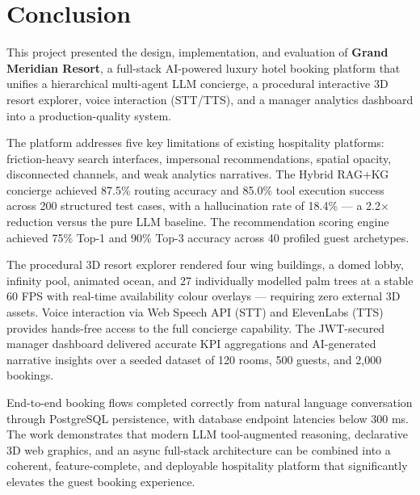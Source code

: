 \documentclass[11pt,a4paper]{report}
\begin{document}
\chapter{Conclusion}

This project presented the design, implementation, and evaluation of \textbf{Grand Meridian Resort}, a full-stack AI-powered luxury hotel booking platform that unifies a hierarchical multi-agent LLM concierge, a procedural interactive 3D resort explorer, voice interaction (STT/TTS), and a manager analytics dashboard into a production-quality system.

The platform addresses five key limitations of existing hospitality platforms: friction-heavy search interfaces, impersonal recommendations, spatial opacity, disconnected channels, and weak analytics narratives. The Hybrid RAG+KG concierge achieved 87.5\% routing accuracy and 85.0\% tool execution success across 200 structured test cases, with a hallucination rate of 18.4\% — a 2.2$\times$ reduction versus the pure LLM baseline. The recommendation scoring engine achieved 75\% Top-1 and 90\% Top-3 accuracy across 40 profiled guest archetypes.

The procedural 3D resort explorer rendered four wing buildings, a domed lobby, infinity pool, animated ocean, and 27 individually modelled palm trees at a stable 60 FPS with real-time availability colour overlays — requiring zero external 3D assets. Voice interaction via Web Speech API (STT) and ElevenLabs (TTS) provides hands-free access to the full concierge capability. The JWT-secured manager dashboard delivered accurate KPI aggregations and AI-generated narrative insights over a seeded dataset of 120 rooms, 500 guests, and 2{,}000 bookings.

End-to-end booking flows completed correctly from natural language conversation through PostgreSQL persistence, with database endpoint latencies below 300 ms. The work demonstrates that modern LLM tool-augmented reasoning, declarative 3D web graphics, and an async full-stack architecture can be combined into a coherent, feature-complete, and deployable hospitality platform that significantly elevates the guest booking experience.

\renewcommand\bibname{References}
\nocite{*}


\end{document}
